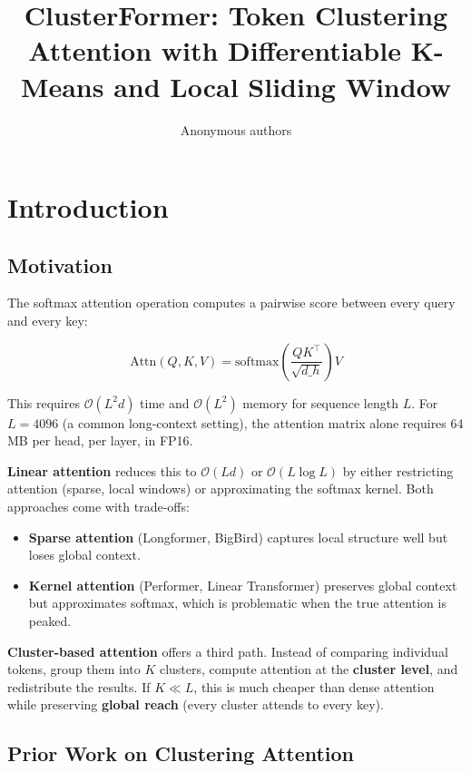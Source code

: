 \title{\textbf{ClusterFormer: Token Clustering Attention with Differentiable K-Means and Local Sliding Window}}

\author{Anonymous authors}


\section{Introduction}

\subsection{Motivation}

The softmax attention operation computes a pairwise score between every 
query and every key:

\[
\text{Attn}(Q, K, V) = \text{softmax}\!\left(\frac{Q K^\top}{\sqrt{d\_h}}\right) V
\]

This requires $\mathcal{O}(L^2 d)$ time and $\mathcal{O}(L^2)$ memory for 
sequence length $L$. For $L = 4096$ (a common long-context setting), the 
attention matrix alone requires 64 MB per head, per layer, in FP16.

\textbf{Linear attention} reduces this to $\mathcal{O}(L d)$ or 
$\mathcal{O}(L \log L)$ by either restricting attention (sparse, local 
windows) or approximating the softmax kernel. Both approaches come with 
trade-offs:

\begin{itemize}
\item \textbf{Sparse attention} (Longformer, BigBird) captures local structure well
  but loses global context.
\item \textbf{Kernel attention} (Performer, Linear Transformer) preserves global
  context but approximates softmax, which is problematic when the true
  attention is peaked.

\end{itemize}
\textbf{Cluster-based attention} offers a third path. Instead of comparing 
individual tokens, group them into $K$ clusters, compute attention at the 
\textbf{cluster level}, and redistribute the results. If $K \ll L$, this is much 
cheaper than dense attention while preserving \textbf{global reach} (every 
cluster attends to every key).

\subsection{Prior Work on Clustering Attention}

